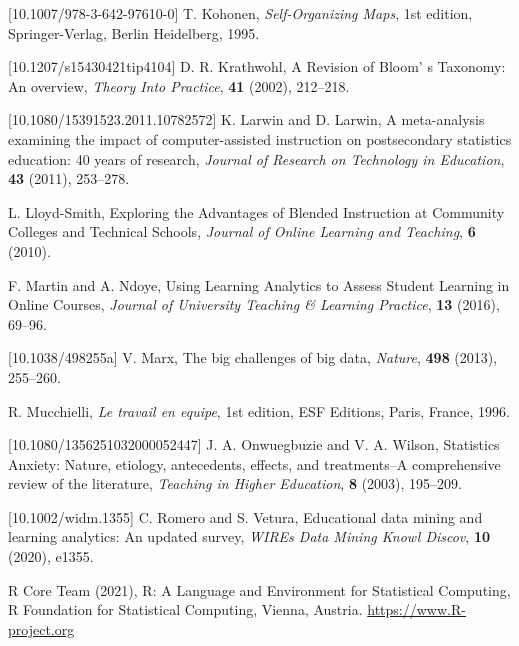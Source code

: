 \documentclass{aims}
\theoremstyle{definition}
\begin{document}
\begin{thebibliography}{99}
 [10.1007/978-3-642-97610-0]
     \newblock T.  Kohonen,
     \newblock \emph{Self-Organizing Maps},
     \newblock 1st edition, Springer-Verlag, Berlin Heidelberg, 1995.

 [10.1207/s15430421tip4104]
     \newblock  D. R. Krathwohl,
     \newblock A Revision of Bloom' s Taxonomy: An overview,
     \newblock \emph{Theory Into Practice}, \textbf{41} (2002), 212--218.

 [10.1080/15391523.2011.10782572]
     \newblock  K. Larwin and D. Larwin,
     \newblock A meta-analysis examining the impact of computer-assisted instruction on postsecondary statistics education: 40 years of research,
     \newblock \emph{Journal of Research on Technology in Education}, \textbf{43} (2011), 253--278.

     \newblock  L. Lloyd-Smith,
     \newblock Exploring the Advantages of Blended Instruction at Community Colleges and Technical Schools,
     \newblock \emph{Journal of Online Learning and Teaching}, \textbf{6} (2010).

     \newblock  F. Martin and A. Ndoye,
     \newblock Using Learning Analytics to Assess Student Learning in Online Courses,
     \newblock \emph{Journal of University Teaching \& Learning Practice}, \textbf{13} (2016), 69--96.

 [10.1038/498255a]
     \newblock  V. Marx,
     \newblock The big challenges of big data,
     \newblock \emph{Nature}, \textbf{498} (2013), 255--260.

     \newblock R. Mucchielli,
     \newblock \emph{Le travail en equipe},
     \newblock 1st edition, ESF Editions, Paris, France, 1996.

 [10.1080/1356251032000052447]
     \newblock J. A. Onwuegbuzie  and V. A. Wilson,
     \newblock Statistics Anxiety: Nature, etiology, antecedents, effects, and treatments--A comprehensive review of the literature,
     \newblock \emph{Teaching in Higher Education}, \textbf{8} (2003), 195--209.

 [10.1002/widm.1355]
     \newblock C. Romero and S. Vetura,
     \newblock Educational data mining and learning analytics: An updated survey,
     \newblock \emph{WIREs Data Mining Knowl Discov}, \textbf{10} (2020), e1355.

     \newblock R Core Team (2021),
     \newblock R: A Language and Environment for Statistical Computing,
     \newblock R Foundation for
  Statistical Computing, Vienna, Austria. \url{
  https://www.R-project.org}


\end{thebibliography}
\end{document}
